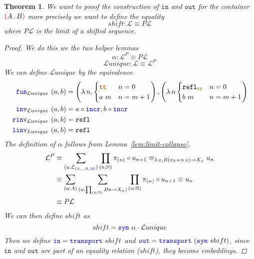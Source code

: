 \documentclass[twoside,11pt,openright]{report}
\theoremstyle{plain} %
\newtheorem{thm}{Theorem}[section]
\theoremstyle{definition}
\theoremstyle{remark}
\newcommand*{\lemref}[1]{Lemma~\ref{lem:#1}}
\newcommand*{\containerpair}[2]{\textcolor{red}{(}#1\,\textcolor{red}{,}\,#2\textcolor{red}{)}}
\newcommand*{\constant}[1]{\textcolor{orange!60!black}{\ensuremath{\mathtt{#1}}}}
\newcommand*{\function}[1]{\textcolor{blue!60!black}{\ensuremath{\mathtt{#1}}}}
\begin{document}
\begin{thm}
  We want to proof the construction of \function{in} and \function{out} for the container \(\containerpair{A}{B}\) more precisely we want to define the equality
  \begin{equation}
    shift : \mathcal{L} \equiv P\mathcal{L}    
  \end{equation}
  where \(P\mathcal{L}\) is the limit of a shifted sequence.
  \begin{proof}
    We do this we the two helper lemmas
    \begin{equation}
      \alpha : \mathcal{L}^P \equiv P\mathcal{L}
    \end{equation}
    \begin{equation}
      \mathcal{L}unique : \mathcal{L} \equiv \mathcal{L}^P
    \end{equation}
    We can define \(\mathcal{L}unique\) by the equivalence
    \begin{align}
      \function{fun}_{\mathcal{L}unique}~(a , b) &= \left( \lambda\,n, \begin{cases} \constant{tt} & n = 0 \\ a~m & n = m + 1 \end{cases}\right) , \left(\lambda\,n \begin{cases} \mathtt{refl}_{\constant{tt}} & n = 0 \\ b~m & n = m + 1 \end{cases}\right) \\
    \function{inv}_{\mathcal{L}unique}~(a , b) &= a \circ \function{incr} , b \circ \function{incr} \\
    \function{rinv}_{\mathcal{L}unique}~(a , b) &= \mathtt{refl} \\
    \function{linv}_{Lunique}~(a , b) &= \mathtt{refl}
    \end{align}
    The definition of \(\alpha\) follows from \lemref{limit-collapse}, 
    \begin{align}
      \mathcal{L}^P &\equiv \sum_{(u : \mathcal{L}_{(\lambda\_,A,\function{id})})} \prod_{(n : \mathbb{N})} \pi_{(n)} \circ u_{n+1} \equiv_{\lambda\,x, B(\pi_2\,a\,n\,x) \rightarrow X_n} u_n \\
          &\equiv \sum_{(a : A)} \sum_{(u : \prod_{(n : \mathbb{N})} B a \rightarrow X_n)} \prod_{(n : \mathbb{N})} \pi_{(n)} \circ u_{n+1} \equiv u_n \\
          &\equiv P\mathcal{L}
    \end{align}
    We can then define \(shift\) as
    \begin{equation}
      shift = \function{sym}~\alpha \cdot \mathcal{L}unique
    \end{equation}
    Then we define \(\function{in} = \function{transport}~shift\) and \(\function{out} = \function{transport}~(\function{sym}~shift)\), since \function{in} and \function{out} are part of an equality relation (\(shift\)), they become embeddings.
    \end{proof}
\end{thm}
\end{document}
